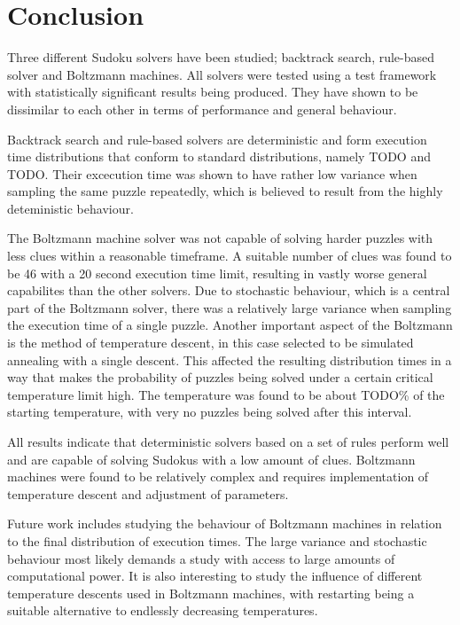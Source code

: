 \documentclass[a4paper,11pt]{kth-mag}
\begin{document}
\chapter{Conclusion}

Three different Sudoku solvers have been studied; backtrack search, rule-based solver and Boltzmann machines.
All solvers were tested using a test framework with statistically significant results being produced.
They have shown to be dissimilar to each other in terms of performance and general behaviour.

Backtrack search and rule-based solvers are deterministic and form execution time distributions that conform to standard distributions, namely TODO and TODO.
Their excecution time was shown to have rather low variance when sampling the same puzzle repeatedly, which is believed to result from the highly deteministic behaviour.

The Boltzmann machine solver was not capable of solving harder puzzles with less clues within a reasonable timeframe.
A suitable number of clues was found to be 46 with a 20 second execution time limit, resulting in vastly worse general capabilites than the other solvers.
Due to stochastic behaviour, which is a central part of the Boltzmann solver, there was a relatively large variance when sampling the execution time of a single puzzle.
Another important aspect of the Boltzmann is the method of temperature descent, in this case selected to be simulated annealing with a single descent.
This affected the resulting distribution times in a way that makes the probability of puzzles being solved under a certain critical temperature limit high.
The temperature was found to be about TODO\% of the starting temperature, with very no puzzles being solved after this interval.

All results indicate that deterministic solvers based on a set of rules perform well and are capable of solving Sudokus with a low amount of clues.
Boltzmann machines were found to be relatively complex and requires implementation of temperature descent and adjustment of parameters.

Future work includes studying the behaviour of Boltzmann machines in relation to the final distribution of execution times.
The large variance and stochastic behaviour most likely demands a study with access to large amounts of computational power.
It is also interesting to study the influence of different temperature descents used in Boltzmann machines, with restarting being a suitable alternative to endlessly decreasing temperatures.
\end{document}
